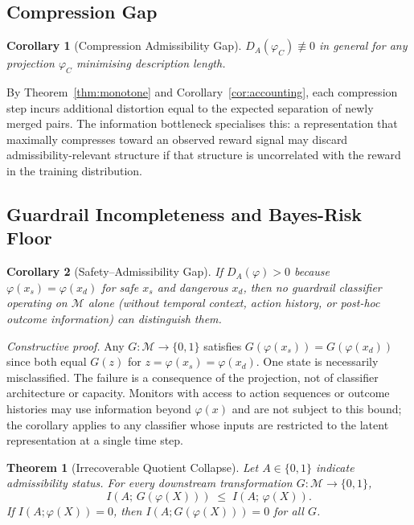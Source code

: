 \documentclass[10pt,twocolumn]{article}
\theoremstyle{plain}
\newtheorem{theorem}{Theorem}
\newtheorem{corollary}{Corollary}
\theoremstyle{definition}
\theoremstyle{remark}
\newcommand{\DA}{D_{A}(\varphi)}
\newcommand{\calM}{\mathcal{M}}
\begin{document}
\subsection{Compression Gap}

\begin{corollary}[Compression Admissibility Gap]
\label{cor:comp}
$D_A(\varphi_C)\not\equiv 0$ in general for any projection $\varphi_C$
minimising description length.
\end{corollary}

By Theorem~\ref{thm:monotone} and Corollary~\ref{cor:accounting}, each compression
step incurs additional distortion equal to the expected separation of newly merged
pairs. The information bottleneck \citep{tishby1999information} specialises this:
a representation that maximally compresses toward an observed reward signal may
discard admissibility-relevant structure if that structure is uncorrelated with
the reward in the training distribution.

\subsection{Guardrail Incompleteness and Bayes-Risk Floor}

\begin{corollary}[Safety--Admissibility Gap]
\label{cor:safety}
If $\DA > 0$ because $\varphi(x_s)=\varphi(x_d)$ for safe $x_s$ and dangerous
$x_d$, then no guardrail classifier operating on $\calM$ alone (without temporal
context, action history, or post-hoc outcome information) can distinguish them.
\end{corollary}

\noindent\textit{Constructive proof.} Any $G:\calM\to\{0,1\}$ satisfies
$G(\varphi(x_s))=G(\varphi(x_d))$ since both equal $G(z)$ for $z=\varphi(x_s)=\varphi(x_d)$.
One state is necessarily misclassified. The failure is a consequence of the
projection, not of classifier architecture or capacity. Monitors with access to
action sequences or outcome histories may use information beyond $\varphi(x)$
and are not subject to this bound; the corollary applies to any classifier whose
inputs are restricted to the latent representation at a single time step.

\begin{theorem}[Irrecoverable Quotient Collapse]
\label{thm:guardrail}
Let $A\in\{0,1\}$ indicate admissibility status. For every downstream
transformation $G:\calM\to\{0,1\}$,
\begin{equation}
  I\!\left(A;\,G(\varphi(X))\right) \;\leq\; I\!\left(A;\,\varphi(X)\right).
\end{equation}
If $I(A;\varphi(X))=0$, then $I(A;G(\varphi(X)))=0$ for all $G$.
\end{theorem}
\end{document}
